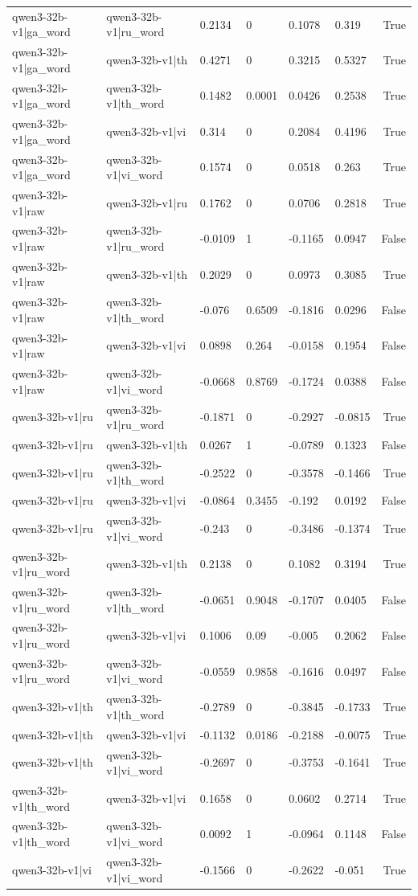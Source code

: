 \begin{table}
\begin{tabular}{llllllr}
qwen3-32b-v1|ga_word & qwen3-32b-v1|ru_word & 0.2134 & 0 & 0.1078 & 0.319 & True \\
qwen3-32b-v1|ga_word & qwen3-32b-v1|th & 0.4271 & 0 & 0.3215 & 0.5327 & True \\
qwen3-32b-v1|ga_word & qwen3-32b-v1|th_word & 0.1482 & 0.0001 & 0.0426 & 0.2538 & True \\
qwen3-32b-v1|ga_word & qwen3-32b-v1|vi & 0.314 & 0 & 0.2084 & 0.4196 & True \\
qwen3-32b-v1|ga_word & qwen3-32b-v1|vi_word & 0.1574 & 0 & 0.0518 & 0.263 & True \\
qwen3-32b-v1|raw & qwen3-32b-v1|ru & 0.1762 & 0 & 0.0706 & 0.2818 & True \\
qwen3-32b-v1|raw & qwen3-32b-v1|ru_word & -0.0109 & 1 & -0.1165 & 0.0947 & False \\
qwen3-32b-v1|raw & qwen3-32b-v1|th & 0.2029 & 0 & 0.0973 & 0.3085 & True \\
qwen3-32b-v1|raw & qwen3-32b-v1|th_word & -0.076 & 0.6509 & -0.1816 & 0.0296 & False \\
qwen3-32b-v1|raw & qwen3-32b-v1|vi & 0.0898 & 0.264 & -0.0158 & 0.1954 & False \\
qwen3-32b-v1|raw & qwen3-32b-v1|vi_word & -0.0668 & 0.8769 & -0.1724 & 0.0388 & False \\
qwen3-32b-v1|ru & qwen3-32b-v1|ru_word & -0.1871 & 0 & -0.2927 & -0.0815 & True \\
qwen3-32b-v1|ru & qwen3-32b-v1|th & 0.0267 & 1 & -0.0789 & 0.1323 & False \\
qwen3-32b-v1|ru & qwen3-32b-v1|th_word & -0.2522 & 0 & -0.3578 & -0.1466 & True \\
qwen3-32b-v1|ru & qwen3-32b-v1|vi & -0.0864 & 0.3455 & -0.192 & 0.0192 & False \\
qwen3-32b-v1|ru & qwen3-32b-v1|vi_word & -0.243 & 0 & -0.3486 & -0.1374 & True \\
qwen3-32b-v1|ru_word & qwen3-32b-v1|th & 0.2138 & 0 & 0.1082 & 0.3194 & True \\
qwen3-32b-v1|ru_word & qwen3-32b-v1|th_word & -0.0651 & 0.9048 & -0.1707 & 0.0405 & False \\
qwen3-32b-v1|ru_word & qwen3-32b-v1|vi & 0.1006 & 0.09 & -0.005 & 0.2062 & False \\
qwen3-32b-v1|ru_word & qwen3-32b-v1|vi_word & -0.0559 & 0.9858 & -0.1616 & 0.0497 & False \\
qwen3-32b-v1|th & qwen3-32b-v1|th_word & -0.2789 & 0 & -0.3845 & -0.1733 & True \\
qwen3-32b-v1|th & qwen3-32b-v1|vi & -0.1132 & 0.0186 & -0.2188 & -0.0075 & True \\
qwen3-32b-v1|th & qwen3-32b-v1|vi_word & -0.2697 & 0 & -0.3753 & -0.1641 & True \\
qwen3-32b-v1|th_word & qwen3-32b-v1|vi & 0.1658 & 0 & 0.0602 & 0.2714 & True \\
qwen3-32b-v1|th_word & qwen3-32b-v1|vi_word & 0.0092 & 1 & -0.0964 & 0.1148 & False \\
qwen3-32b-v1|vi & qwen3-32b-v1|vi_word & -0.1566 & 0 & -0.2622 & -0.051 & True \\
\bottomrule
\end{tabular}
\end{table}
